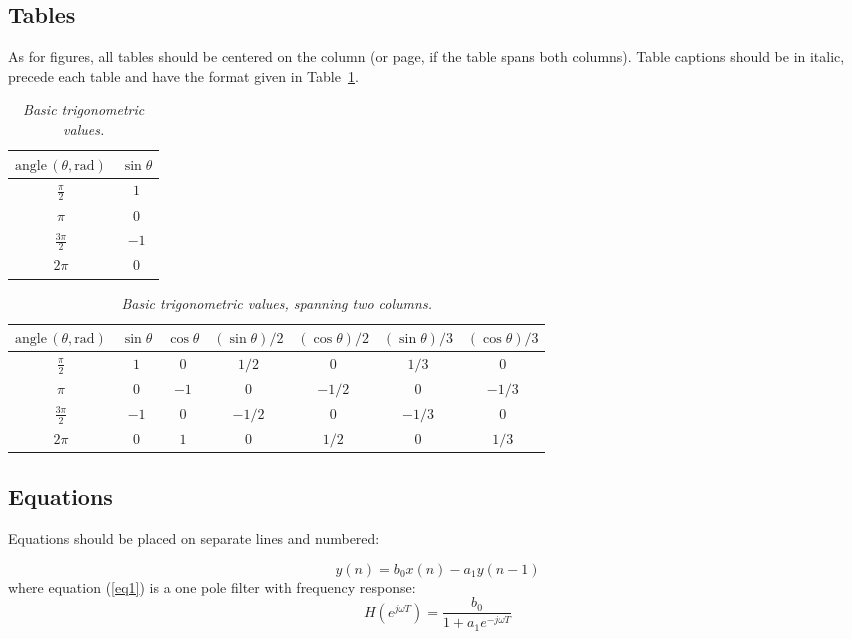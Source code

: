 \documentclass[a4paper]{article}
\begin{document}
\subsection{Tables}

As for figures, all tables should be centered on the column (or page, if the
table spans both columns). Table captions should be in italic, precede each
table and have the format given in Table~\ref{tab:example}.

\begin{table}[ht]
  \caption{\itshape Basic trigonometric values.}
	\centering
	\begin{tabular}{|c|c|}
		\hline
		$\mathrm{angle}\,(\theta, \mathrm{rad})$ & $\sin \theta$ \\\hline
		$\frac{\pi}{2}$ & $1$ \\
		$\pi$ & $0$ \\
		$\frac{3\pi}{2}$ & $-1$ \\
		$2\pi$ & $0$ \\\hline
	\end{tabular}
	\label{tab:example}
\end{table}

\begin{table}[ht]
  \caption{{\it Basic trigonometric values, spanning two columns.}}
	\centering
  \begin{tabular}{|c|c|c|c|c|c|c|}\hline
    $\mathrm{angle}\, (\theta, \mathrm{rad})$ & $\sin \theta$ & $\cos \theta $ & $(\sin \theta)/2 $ & $(\cos \theta) /2 $ & $(\sin \theta)/3 $ & $(\cos \theta)/3$    \\\hline
    $\frac{\pi}{2}$ & $1$ & $0$ & $1/2$ & $0$ & $1/3$ & $0$ \\
    $\pi$ & $0$ & $-1$ & $0$ & $-1/2$ & $0$ & $-1/3$\\
    $\frac{3\pi}{2}$ & $-1$ & $0$ & $-1/2$ & $0$ & $-1/3$ & $0$ \\
    $2\pi$ & $0$ & $1$ & $0$ & $1/2$ & $0$ & $1/3$ \\\hline
 \end{tabular}
  \label{tab:example2}
\end{table}

\subsection{Equations}

Equations should be placed on separate lines and numbered:

\begin{equation}
	y(n)=b_0x(n)-a_1y(n-1)
	\label{eq1}
	\end{equation}
	where equation (\ref{eq1}) is a one pole filter with frequency response:
	\begin{equation}
	H(e^{j \omega T}) = \frac{b_0}{1+a_1e^{-j \omega T}}
	\label{eq2}
\end{equation}
\end{document}
